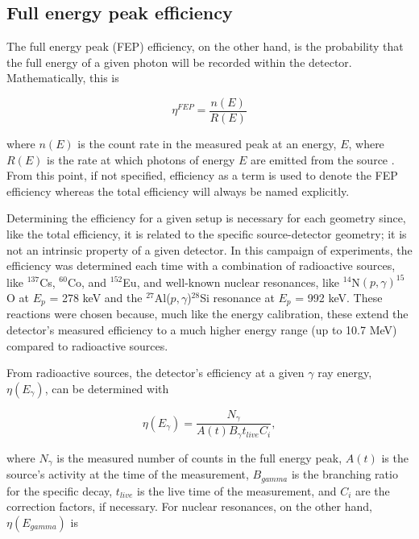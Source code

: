 \subsection{Full energy peak efficiency}

The full energy peak (FEP) efficiency, on the other hand, is the probability that the full energy of a given photon will be recorded within the detector. Mathematically, this is

\begin{equation}
\eta^{FEP} = \dfrac{n(E)}{R(E)}
\end{equation}

\noindent where $n(E)$ is the count rate in the measured peak at an energy, $E$, where $R(E)$ is the rate at which photons of energy $E$ are emitted from the source \cite{DebertinHelmerBook}. From this point, if not specified, efficiency as a term is used to denote the FEP efficiency whereas the total efficiency will always be named explicitly. 

Determining the efficiency for a given setup is necessary for each geometry since, like the total efficiency, it is related to the specific source-detector geometry; it is not an intrinsic property of a given detector. In this campaign of experiments, the efficiency was determined each time with a combination of radioactive sources, like $^{137}$Cs, $^{60}$Co, and $^{152}$Eu, and well-known nuclear resonances, like $^{14}$N$\left( p,\gamma \right) ^{15}$O at $E_{p}$ = 278 keV and the $^{27}$Al($p, \gamma$)$^{28}$Si resonance at $E_{p}$ = 992 keV. These reactions were chosen because, much like the energy calibration, these extend the detector's measured efficiency to a much higher energy range (up to 10.7 MeV) compared to radioactive sources. 

From radioactive sources, the detector's efficiency at a given $\gamma$ ray energy, $\eta(E_{\gamma})$, can be determined with

\begin{equation}
\eta (E_{\gamma}) = \dfrac{N_{\gamma}}{A(t) B_{\gamma} t_{live} C_{i}},
\end{equation}

\noindent where $N_{\gamma}$ is the measured number of counts in the full energy peak, $A(t)$ is the source's activity at the time of the measurement, $B_{gamma}$ is the branching ratio for the specific decay, $t_{live}$ is the live time of the measurement, and $C_{i}$ are the correction factors, if necessary. For nuclear resonances, on the other hand, $\eta (E_{gamma})$ is 

